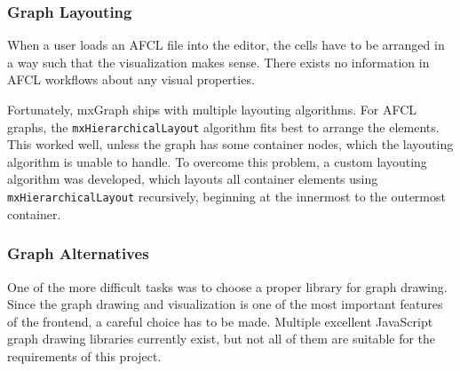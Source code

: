 \documentclass[a4paper,top=25mm,bottom=25mm,12pt,pdftex,halfparskip,twoside,bibtotoc,numbers=noenddot]{scrbook}
\begin{document}

\subsubsection{Graph Layouting}

When a user loads an AFCL file into the editor, the cells have to be arranged in a way such that the visualization makes sense. There exists no information in AFCL workflows about any visual properties. 

Fortunately, mxGraph ships with multiple layouting algorithms.
For AFCL graphs, the \texttt{mxHierarchicalLayout} algorithm fits best to arrange the elements. This worked well, unless the graph has some container nodes, which the layouting algorithm is unable to handle.
To overcome this problem, a custom layouting algorithm was developed, which layouts all container elements using \texttt{mxHierarchicalLayout} recursively, beginning at the innermost to the outermost container.

\label{sec:graph-alternatives}
\subsubsection{Graph Alternatives}

One of the more difficult tasks was to choose a proper library for graph drawing. Since the graph drawing and visualization is one of the most important features of the frontend, a careful choice has to be made. Multiple excellent JavaScript graph drawing libraries currently exist, but not all of them are suitable for the requirements of this project.
\end{document}
